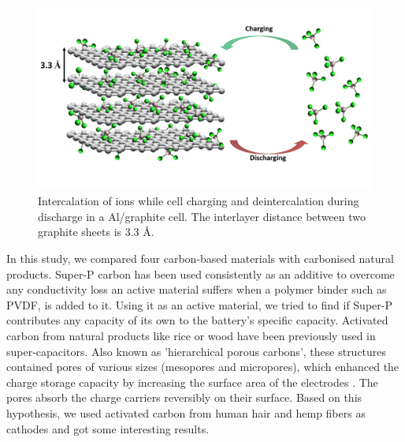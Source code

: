  \begin{figure}[tbh!]
  \centering
  \includegraphics[width=\textwidth]{Figures/chap5fig/graphmech}
    \caption{Intercalation of  ions while cell charging and deintercalation during discharge in a Al/graphite cell. The interlayer distance between two graphite sheets is 3.3 \AA.}
  \label{Figures/chap5fig:graphmech}
\end{figure}
In this study, we compared four carbon-based materials with carbonised natural products. Super-P carbon has been used consistently as an additive to overcome any conductivity loss an active material suffers when a polymer binder such as PVDF, is added to it. Using it as an active material, we tried to find if Super-P contributes any capacity of its own to the battery's specific capacity. Activated carbon from natural products like rice or wood have been previously used in super-capacitors\cite{hussain_development_2019, frackowiak_carbon_2001}. Also known as 'hierarchical porous carbons', these structures contained pores of various sizes (mesopores and micropores), which enhanced the charge storage capacity by increasing the surface area of the electrodes . The pores absorb the charge carriers reversibly on their surface. Based on this hypothesis, we used activated carbon from human hair and hemp fibers as cathodes and got some interesting results. 

